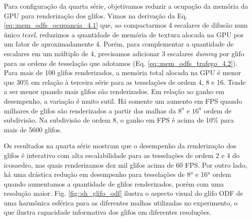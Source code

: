 Para configuração da quarta série, objetivamos reduzir a ocupação da memória da GPU para renderização dos glifos. Vimos na derivação da Eq. \ref{eq::mem_odfs_ocupancia_4.1} que, ao compactarmos 4 escalares de difusão num único \textit{texel}, reduzimos a quantidade de memória de textura alocada na GPU por um fator de aproximadamente 4. Porém, para complementar a quantidade de escalares em um múltiplo de 4, precisamos adicionar 3 escalares \textit{dummy} por glifo para as ordens de tesselação que adotamos (Eq. \ref{eq::mem_odfs_trafego_4.2}). Para mais de 100 glifos renderizados, a memória total alocada na GPU é menor que $30\%$ em relação à terceira série para as tesselações de ordem 4, 8 e 16. Tende a ser menor quando mais glifos são renderizados. Em relação ao ganho em desempenho, a variação é muito sutil. Há somente um aumento em FPS quando milhares de glifos são renderizados a partir das malhas da $8^a$ e $16^a$ ordem de subdivisão. Na subdivisão de ordem 8, o ganho em FPS é acima de 10\% para mais de 5600 glifos. %


Os resultados na quarta série mostram que o desempenho da renderização dos glifos é interativo com alta escalabilidade para as tesselações de ordem 2 e 4 do icosaedro, nas quais renderizamos dez mil glifos acima de 60 FPS. Por outro lado, há uma drástica redução em desempenho para tesselações de 8$^a$ e 16$^a$ ordem quando aumentamos a quantidade de glifos renderizados, porém com uma resolução maior. Fig. \ref{fig::sh_glifo_odf} ilustra o aspecto visual do glifo ODF de uma harmônica esférica para as diferentes malhas utilizadas no experimento, o que ilustra capacidade informativa dos glifos em diferentes resoluções.

